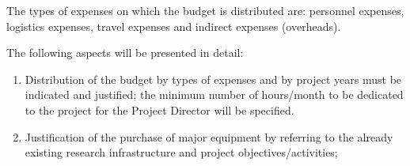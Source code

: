 \documentclass[draftproposal,pncdib]{pncdi-pd}
\begin{document}
\begin{pncdiexplanation}
The types of expenses on which the budget is distributed are: personnel expenses,
logistics expenses, travel expenses and indirect expenses (overheads).

The following aspects will be presented in detail:
\begin{enumerate}[(1), leftmargin=*, noitemsep]
\item
Distribution of the budget by types of expenses and by project years must be indicated
and justified; the minimum number of hours/month to be dedicated to the project for
the Project Director will be specified.

\item
Justification of the purchase of major equipment by referring to the already
existing research infrastructure and project objectives/activities;
\end{enumerate}
\end{pncdiexplanation}

\medskip
\end{document}
